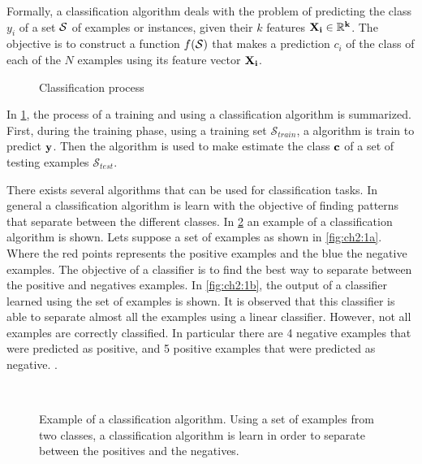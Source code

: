 Formally, a classification algorithm deals with the problem	of predicting the class $y_i$ of a 
set $\cal S$ of examples or instances, given their $k$ features \mbox{$\bf{X}_i \in 
\mathbb{R}^k$}. The objective is to construct a function $f(\cal{S})$ that makes a prediction 
$c_i$ of the class of each of the $N$ examples using its feature vector $\bf{X}_i$.
\label{ntn:ch2:1}

\begin{figure}
	\centering
	
  \caption{Classification process}
  \label{fig:ch2:0}
\end{figure}


In \figurename{ \ref{fig:ch2:0}}, the process of a training and using a classification algorithm is 
summarized. First, during the training phase, using a training set $\mathcal{S}_{train}$, a 
algorithm is train to predict $\bf y$. Then the algorithm is used to make estimate the class $\bf 
c$ of a set of testing examples $\mathcal{S}_{test}$.

There exists several algorithms that can be used for classification tasks. In general a 
classification algorithm is learn with the objective of finding patterns that separate between the 
different classes. In \figurename{ \ref{fig:ch2:1}} an example of a classification algorithm is 
shown. Lets suppose a set of examples as shown in \figurename{ \ref{fig:ch2:1a}}.  Where the red 
points represents the positive examples and the blue the negative examples. The objective of a 
classifier is to find the best way to separate between the positive and negatives examples. In 
\figurename{ \ref{fig:ch2:1b}}, the output of a classifier learned using the set of examples is 
shown. It is observed that this classifier is able to separate almost all the examples using a 
linear classifier. However, not all examples are correctly classified. In particular there are 4 
negative examples that were predicted as positive, and 5 positive examples that were predicted as 
negative. .

\begin{figure}[!t]
\centering
{}
\\
\caption{Example of a classification algorithm. Using a set of examples from two classes, a 
	classification algorithm is learn in order to separate between the positives and the negatives. }
\label{fig:ch2:1}
\end{figure} 

